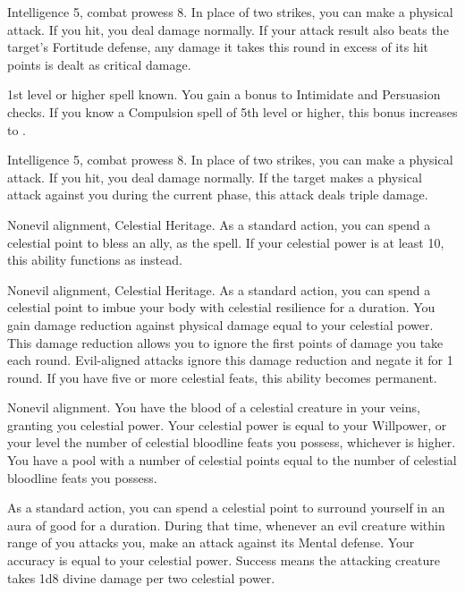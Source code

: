 \featpres Intelligence 5, combat prowess 8.
\featben In place of two strikes, you can make a physical attack.
If you hit, you deal damage normally.
If your attack result also beats the target's Fortitude defense, any damage it takes this round in excess of its hit points is dealt as critical damage.

\featpre 1st level or higher  spell known.
\featben You gain a  bonus to Intimidate and Persuasion checks.
If you know a Compulsion spell of 5th level or higher, this bonus increases to .

\featpres Intelligence 5, combat prowess 8.
\featben In place of two strikes, you can make a physical attack.
If you hit, you deal damage normally.
If the target makes a physical attack against you during the current phase, this attack deals triple damage.

\featpres Nonevil alignment, Celestial Heritage.
\featben As a standard action, you can spend a celestial point to bless an ally, as the  spell.
If your celestial power is at least 10, this ability functions as  instead.

\featpres Nonevil alignment, Celestial Heritage.
\featben As a standard action, you can spend a celestial point to imbue your body with celestial resilience for a \durshort duration.
You gain damage reduction against physical damage equal to your celestial power.
This damage reduction allows you to ignore the first points of damage you take each round.
Evil-aligned attacks ignore this damage reduction and negate it for 1 round.
If you have five or more celestial feats, this ability becomes permanent.

\featpre Nonevil alignment.
\featben You have the blood of a celestial creature in your veins, granting you celestial power.
Your celestial power is equal to your Willpower, or your level \add the number of celestial bloodline feats you possess, whichever is higher.
You have a pool with a number of celestial points equal to the number of celestial bloodline feats you possess.

As a standard action, you can spend a celestial point to surround yourself in an aura of good for a \durshort duration.
During that time, whenever an evil creature within \rngclose range of you attacks you, make an attack against its Mental defense.
Your accuracy is equal to your celestial power.
Success means the attacking creature takes 1d8 divine damage per two celestial power.

